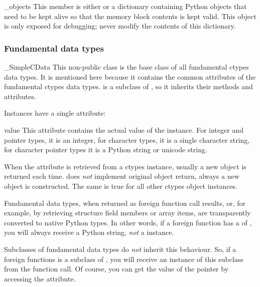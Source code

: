\begin{memberdesc}{_objects}
This member is either  or a dictionary containing Python
objects that need to be kept alive so that the memory block
contents is kept valid.  This object is only exposed for
debugging; never modify the contents of this dictionary.
\end{memberdesc}


\subsubsection{Fundamental data types\label{ctypes-fundamental-data-types-2}}

\begin{classdesc*}{_SimpleCData}
This non-public class is the base class of all fundamental ctypes
data types. It is mentioned here because it contains the common
attributes of the fundamental ctypes data types.  
is a subclass of , so it inherits their methods and
attributes.
\end{classdesc*}

Instances have a single attribute:

\begin{memberdesc}{value}
This attribute contains the actual value of the instance. For
integer and pointer types, it is an integer, for character types,
it is a single character string, for character pointer types it
is a Python string or unicode string.

When the  attribute is retrieved from a ctypes instance,
usually a new object is returned each time.   does \emph{not}
implement original object return, always a new object is
constructed.  The same is true for all other ctypes object
instances.
\end{memberdesc}

Fundamental data types, when returned as foreign function call
results, or, for example, by retrieving structure field members or
array items, are transparently converted to native Python types.  In
other words, if a foreign function has a  of ,
you will always receive a Python string, \emph{not} a 
instance.

Subclasses of fundamental data types do \emph{not} inherit this behaviour.
So, if a foreign functions  is a subclass of ,
you will receive an instance of this subclass from the function call.
Of course, you can get the value of the pointer by accessing the
 attribute.

